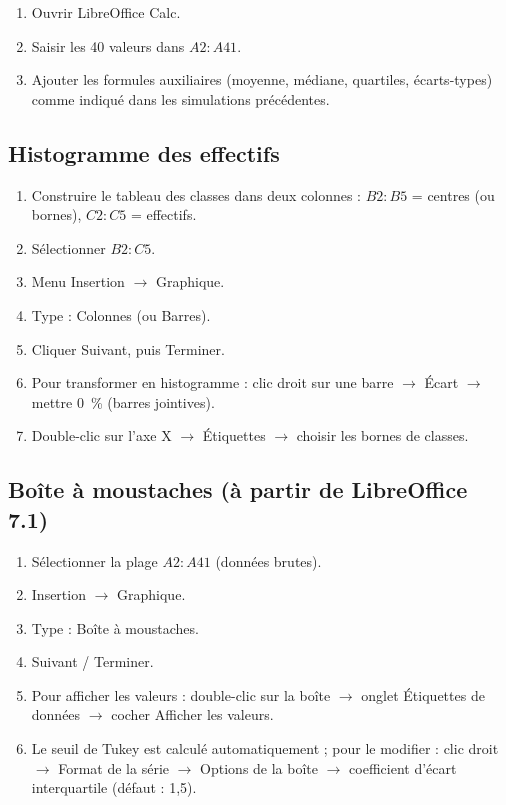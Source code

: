 \documentclass[11pt,a4paper]{article}
\begin{document}
\begin{enumerate}[label=\textbf{\arabic*.}]
  \item Ouvrir LibreOffice Calc.
  \item Saisir les 40 valeurs dans \( A2:A41 \).
  \item Ajouter les formules auxiliaires (moyenne, médiane, quartiles,
        écarts-types) comme indiqué dans les simulations précédentes.
\end{enumerate}

\subsection{Histogramme des effectifs}

\begin{enumerate}[label=\textbf{\arabic*.}]
  \item Construire le tableau des classes dans deux colonnes :
        \( B2:B5 \) = centres (ou bornes), \( C2:C5 \) = effectifs.
  \item Sélectionner \( B2:C5 \).
  \item Menu \textsf{Insertion \(\to\) Graphique}.
  \item Type : \textsf{Colonnes} (ou \textsf{Barres}).
  \item Cliquer \textsf{Suivant}, puis \textsf{Terminer}.
  \item Pour transformer en histogramme : clic droit sur une barre
        \(\to\) \textsf{Écart} \(\to\) mettre \SI{0}{\percent}
        (barres jointives).
  \item Double-clic sur l'axe X \(\to\) \textsf{Étiquettes} \(\to\)
        choisir les bornes de classes.
\end{enumerate}

\subsection{Boîte à moustaches (à partir de LibreOffice 7.1)}

\begin{enumerate}[label=\textbf{\arabic*.}]
  \item Sélectionner la plage \( A2:A41 \) (données brutes).
  \item \textsf{Insertion \(\to\) Graphique}.
  \item Type : \textsf{Boîte à moustaches}.
  \item Suivant / Terminer.
  \item Pour afficher les valeurs : double-clic sur la boîte
        \(\to\) onglet \textsf{Étiquettes de données} \(\to\) cocher
        \textsf{Afficher les valeurs}.
  \item Le seuil de Tukey est calculé automatiquement ;
        pour le modifier : clic droit \(\to\) \textsf{Format de la série}
        \(\to\) \textsf{Options de la boîte} \(\to\) coefficient
        d'écart interquartile (défaut : 1,5).
\end{enumerate}
\end{document}
